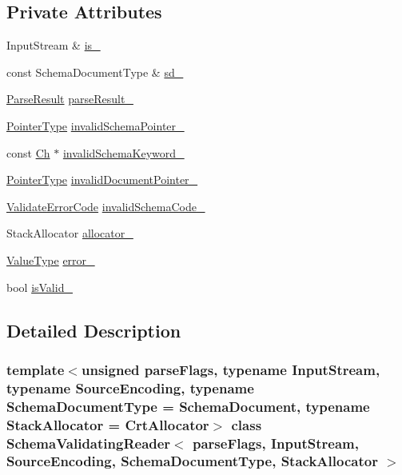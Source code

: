 \subsection*{Private Attributes}
\begin{DoxyCompactItemize}
\item 
Input\+Stream \& \hyperlink{classSchemaValidatingReader_afef08820b573230fb30ffae3b084807f}{is\+\_\+}
\item 
const Schema\+Document\+Type \& \hyperlink{classSchemaValidatingReader_a920ecfbd20bf519ef36af81239f97958}{sd\+\_\+}
\item 
\hyperlink{structParseResult}{Parse\+Result} \hyperlink{classSchemaValidatingReader_a8d246c6285362e5a2eb578a6f7cebf25}{parse\+Result\+\_\+}
\item 
\hyperlink{classSchemaValidatingReader_a30ecf1b20ca5a1b79e0d5f4ceb3bf198}{Pointer\+Type} \hyperlink{classSchemaValidatingReader_a2ba358d223cd4ec6a413e64a84d3e568}{invalid\+Schema\+Pointer\+\_\+}
\item 
const \hyperlink{classSchemaValidatingReader_a6eb6f887a49dbb400800ab4fc01f02c7}{Ch} $\ast$ \hyperlink{classSchemaValidatingReader_a3935c72075571724b2db127351eb39be}{invalid\+Schema\+Keyword\+\_\+}
\item 
\hyperlink{classSchemaValidatingReader_a30ecf1b20ca5a1b79e0d5f4ceb3bf198}{Pointer\+Type} \hyperlink{classSchemaValidatingReader_ad4a32d0f16f800399813a1caab6e2453}{invalid\+Document\+Pointer\+\_\+}
\item 
\hyperlink{group__RAPIDJSON__ERRORS_ga2e1f88f94a5d9a6817a5de0ed2f0105a}{Validate\+Error\+Code} \hyperlink{classSchemaValidatingReader_a33ec294ce0352abc0ac24b2e69c10b70}{invalid\+Schema\+Code\+\_\+}
\item 
Stack\+Allocator \hyperlink{classSchemaValidatingReader_a7bb53669e646c4a712780c0df55f75a5}{allocator\+\_\+}
\item 
\hyperlink{classSchemaValidatingReader_af08b51fcef602c68d95769c35ae606be}{Value\+Type} \hyperlink{classSchemaValidatingReader_a1d948f949d9f946a03b35301cd6ec9be}{error\+\_\+}
\item 
bool \hyperlink{classSchemaValidatingReader_a4e0dcf24425a3ac3954ac08bb5f9823c}{is\+Valid\+\_\+}
\end{DoxyCompactItemize}


\subsection{Detailed Description}
\subsubsection*{template$<$unsigned parse\+Flags, typename Input\+Stream, typename Source\+Encoding, typename Schema\+Document\+Type = Schema\+Document, typename Stack\+Allocator = Crt\+Allocator$>$\newline
class Schema\+Validating\+Reader$<$ parse\+Flags, Input\+Stream, Source\+Encoding, Schema\+Document\+Type, Stack\+Allocator $>$}

